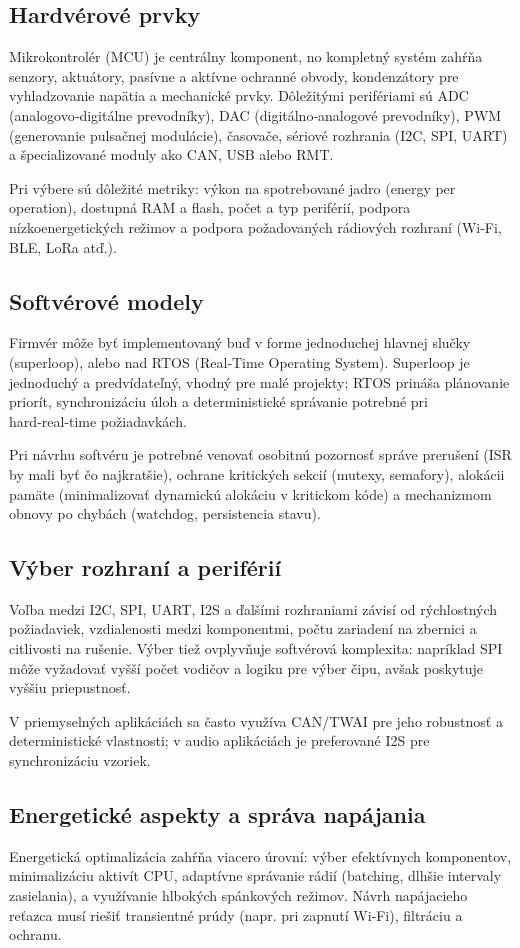 \subsection*{Hardvérové prvky}
Mikrokontrolér (MCU) je centrálny komponent, no kompletný systém zahŕňa senzory, aktuátory, pasívne a aktívne ochranné obvody, kondenzátory pre vyhladzovanie napätia a mechanické prvky. Dôležitými perifériami sú ADC (analogovo‑digitálne prevodníky), DAC (digitálno‑analogové prevodníky), PWM (generovanie pulsačnej modulácie), časovače, sériové rozhrania (I2C, SPI, UART) a špecializované moduly ako CAN, USB alebo RMT.

Pri výbere sú dôležité metriky: výkon na spotrebované jadro (energy per operation), dostupná RAM a flash, počet a typ periférií, podpora nízkoenergetických režimov a podpora požadovaných rádiových rozhraní (Wi‑Fi, BLE, LoRa atď.).

\subsection*{Softvérové modely}
Firmvér môže byť implementovaný buď v forme jednoduchej hlavnej slučky (superloop), alebo nad RTOS (Real‑Time Operating System). Superloop je jednoduchý a predvídateľný, vhodný pre malé projekty; RTOS prináša plánovanie priorít, synchronizáciu úloh a deterministické správanie potrebné pri hard‑real‑time požiadavkách.

Pri návrhu softvéru je potrebné venovať osobitnú pozornosť správe prerušení (ISR by mali byť čo najkratšie), ochrane kritických sekcií (mutexy, semafory), alokácii pamäte (minimalizovať dynamickú alokáciu v kritickom kóde) a mechanizmom obnovy po chybách (watchdog, persistencia stavu).

\subsection*{Výber rozhraní a periférií}
Voľba medzi I2C, SPI, UART, I2S a ďalšími rozhraniami závisí od rýchlostných požiadaviek, vzdialenosti medzi komponentmi, počtu zariadení na zbernici a citlivosti na rušenie. Výber tiež ovplyvňuje softvérová komplexita: napríklad SPI môže vyžadovať vyšší počet vodičov a logiku pre výber čipu, avšak poskytuje vyššiu priepustnosť.

V priemyselných aplikáciách sa často využíva CAN/TWAI pre jeho robustnosť a deterministické vlastnosti; v audio aplikáciách je preferované I2S pre synchronizáciu vzoriek.

\subsection*{Energetické aspekty a správa napájania}
Energetická optimalizácia zahŕňa viacero úrovní: výber efektívnych komponentov, minimalizáciu aktivít CPU, adaptívne správanie rádií (batching, dlhšie intervaly zasielania), a využívanie hlbokých spánkových režimov. Návrh napájacieho reťazca musí riešiť transientné prúdy (napr. pri zapnutí Wi‑Fi), filtráciu a ochranu.

